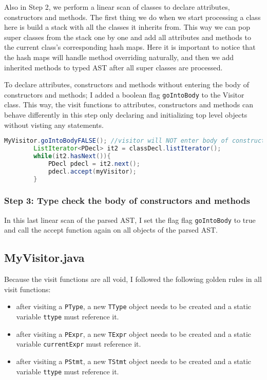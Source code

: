 \documentclass[a4paper,12pt,twoside]{article}
\begin{document}
	Also in Step 2, we perform a linear scan of classes to declare attributes, constructors and methods. The first thing we do when we start processing a class here is build a stack with all the classes it inherits from. This way we can pop super classes from the stack one by one and add all attributes and methods to the current class's corresponding hash maps. Here it is important to notice that the hash maps will handle method overriding naturally, and then we add inherited methods to typed AST after all super classes are processed.
	
	To declare attributes, constructors and methods without entering the body of constructors and methods; I added a boolean flag \texttt{goIntoBody} to the Visitor class. This way, the visit functions to attributes, constructors and methods can behave differently in this step only declaring and initializing top level objects without visting any statements.
	\begin{lstlisting}[language=Java]
		MyVisitor.goIntoBodyFALSE(); //visitor will NOT enter body of constructors and methos
		ListIterator<PDecl> it2 = classDecl.listIterator();
		while(it2.hasNext()){
			PDecl pdecl = it2.next();
			pdecl.accept(myVisitor);
		}
	\end{lstlisting}
	
	\subsubsection{Step 3: Type check the body of constructors and methods}
	
	In this last linear scan of the parsed AST, I set the flag flag \texttt{goIntoBody} to true and call the accept function again on all objects of the parsed AST.
	
	\subsection{MyVisitor.java}
	
	Because the visit functions are all void, I followed the following golden rules in all visit functions:
	
	\begin{itemize}
		\item after visiting a \texttt{PType}, a new \texttt{TType} object needs to be created and a static variable \texttt{ttype} must reference it.
		\item after visiting a \texttt{PExpr}, a new \texttt{TExpr} object needs to be created and a static variable \texttt{currentExpr} must reference it.
		\item after visiting a \texttt{PStmt}, a new \texttt{TStmt} object needs to be created and a static variable \texttt{ttype} must reference it.
	\end{itemize}
	
\end{document}
